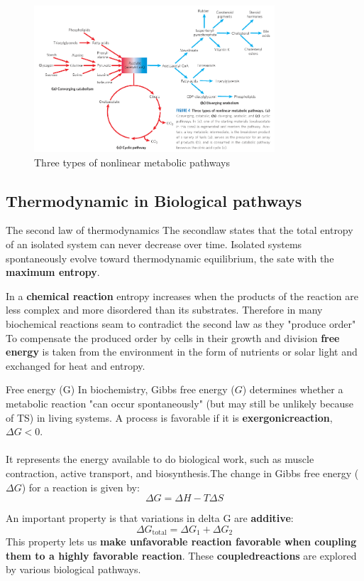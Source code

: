 \documentclass[../main.tex]{subfiles}
\begin{document}
\begin{figure}[H]
	\centering
	\includegraphics[width=0.8\textwidth]{pathways}
	\caption{Three types of nonlinear metabolic pathways}
\end{figure}


\subsection{Thermodynamic in Biological pathways}
\begin{DefWithTitle}{The second law of thermodynamics}
	The \gls{secondlaw} states that the total entropy of an isolated system can never decrease over time. Isolated systems spontaneously evolve toward thermodynamic equilibrium, the sate with the \textbf{maximum \gls{entropy}}.
\end{DefWithTitle}
In a \textbf{chemical reaction} entropy increases when the products of the reaction are less complex and more disordered than its substrates. Therefore in many biochemical reactions seam to contradict the second law as they "produce order"\\
To compensate the produced order by cells in their growth and division \textbf{free energy} is taken from the environment in the form of nutrients or solar light and exchanged for heat and entropy.
 
\begin{DefWithTitle}{Free energy (G)}
	In biochemistry, Gibbs free energy (\(G\)) determines whether a metabolic reaction "can occur spontaneously" (but may still be unlikely because of TS) in living systems. A process is favorable if it is \textbf{\gls{exergonicreaction}}, \(\Delta G < 0\). \\
	\\
	It represents the energy available to do biological work, such as muscle contraction, active transport, and biosynthesis.The change in Gibbs free energy (\(\Delta G\)) for a reaction is given by:
	\[
	\Delta G = \Delta H - T \Delta S
	\]
\end{DefWithTitle} 
An important property is that variations in delta G are \textbf{additive}:
\[
\Delta G_{\text{total}} = \Delta G_1 + \Delta G_2
\]
This property lets us \textbf{make unfavorable reaction favorable when coupling them to a highly favorable reaction}. These \textbf{\gls{coupledreactions}} are explored by various biological pathways.


\end{document}
